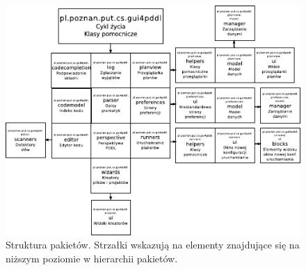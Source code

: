 \begin{figure}[h!]
    \centering
    \includegraphics[width=\textwidth]{img/packets_scheme}
    \caption{Struktura pakietów. Strzałki wskazują na elementy znajdujące się na niższym poziomie w hierarchii pakietów.}
    \label{fig:packets_scheme}
\end{figure}

